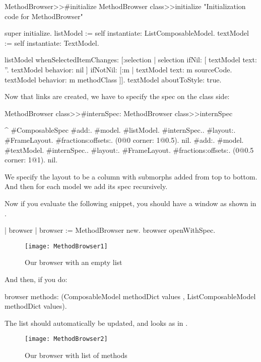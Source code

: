\documentclass[a4paper,10pt,twoside]{book}
\begin{document}
\begin{method}{MethodBrowser>>\#initialize}
MethodBrowser class>>initialize
	"Initialization code for MethodBrowser"

	super initialize.
	listModel := self instantiate: ListComposableModel.
	textModel := self instantiate: TextModel.
		
	listModel whenSelectedItemChanges: [:selection |
		selection
			ifNil: [
				textModel text: ''.
				textModel behavior: nil ]
			ifNotNil: [:m | 
				textModel text: m sourceCode.
				textModel behavior: m methodClass ]].
	textModel aboutToStyle: true.
\end{method}

Now that links are created, we have to specify the spec on the class side:

\begin{method}{MethodBrowser class>>\#internSpec:}
MethodBrowser class>>internSpec

	^{ #ComposableSpec
			#add:. {{#model. #listModel. #internSpec.}.
						#layout:. {#FrameLayout.
									#fractions:offsets:. (0@0 corner: 1@0.5). nil}}.
			#add:. {{#model. #textModel. #internSpec.}.
						#layout:. {#FrameLayout.
									#fractions:offsets:. (0@0.5 corner: 1@1). nil}}}.
\end{method}
%
We specify the layout to be a column with submorphs added from top to bottom. And then for each model we add its spec recursively.

Now if you evaluate the following snippet, you should have a window as shown in .

\begin{code}{}
| browser |
browser := MethodBrowser new.
browser openWithSpec.
\end{code}



\begin{figure}[ht]
\begin{center}
	\texttt{[image: MethodBrowser1]}
	\caption{Our browser with an empty list}
\end{center}
\end{figure}

And then, if you do:
%
\begin{code}{}
browser  methods: (ComposableModel methodDict values , ListComposableModel methodDict values).
\end{code}
The list should automatically be updated, and looks as in .
\begin{figure}[ht]
\begin{center}
	\texttt{[image: MethodBrowser2]}
	\caption{Our browser with list of methods}
\end{center}
\end{figure}
\end{document}
